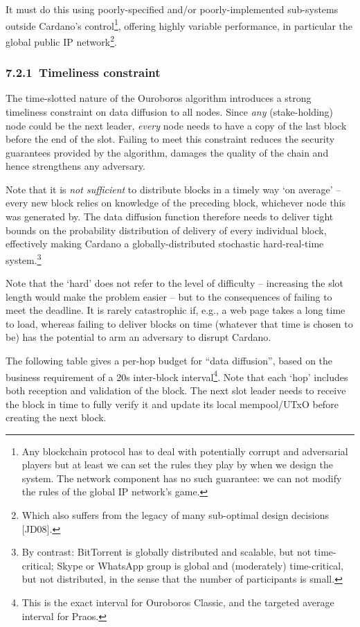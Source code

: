 \documentclass[]{article}
\begin{document}
It must do this using poorly-specified and/or poorly-implemented
sub-systems outside Cardano's control\footnote{Any blockchain protocol
  has to deal with potentially corrupt and adversarial players but at
  least we can set the rules they play by when we design the system. The
  network component has no such guarantee: we can not modify the rules
  of the global IP network's game.}, offering highly variable
performance, in particular the global public IP network\footnote{Which
  also suffers from the legacy of many sub-optimal design decisions
  {[}JD08{]}.}.

\hypertarget{timeliness-constraint}{%
\subsubsection{​7.2.1​~Timeliness
constraint}\label{timeliness-constraint}}

The time-slotted nature of the Ouroboros algorithm introduces a strong
timeliness constraint on data diffusion to all nodes. Since \emph{any}
(stake-holding) node could be the next leader, \emph{every} node needs
to have a copy of the last block before the end of the slot. Failing to
meet this constraint reduces the security guarantees provided by the
algorithm, damages the quality of the chain and hence strengthens any
adversary.

Note that it is \emph{not sufficient} to distribute blocks in a timely
way `on average' -- every new block relies on knowledge of the preceding
block, whichever node this was generated by. The data diffusion function
therefore needs to deliver tight bounds on the probability distribution
of delivery of every individual block, effectively making Cardano a
globally-distributed stochastic hard-real-time system.\footnote{By
  contrast: BitTorrent is globally distributed and scalable, but not
  time-critical; Skype or WhatsApp group is global and (moderately)
  time-critical, but not distributed, in the sense that the number of
  participants is small.}

Note that the `hard' does not refer to the level of difficulty --
increasing the slot length would make the problem easier -- but to the
consequences of failing to meet the deadline. It is rarely catastrophic
if, e.g., a web page takes a long time to load, whereas failing to
deliver blocks on time (whatever that time is chosen to be) has the
potential to arm an adversary to disrupt Cardano.

The following table gives a per-hop budget for ``data diffusion'', based
on the business requirement of a 20s inter-block interval\footnote{This
  is the exact interval for Ouroboros Classic, and the targeted average
  interval for Praos.}. Note that each `hop' includes both reception and
validation of the block. The next slot leader needs to receive the block
in time to fully verify it and update its local mempool/UTxO before
creating the next block.
\end{document}
